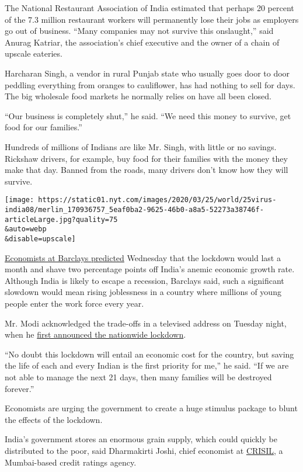 The National Restaurant Association of India estimated that perhaps 20
percent of the 7.3 million restaurant workers will permanently lose
their jobs as employers go out of business. ``Many companies may not
survive this onslaught,'' said Anurag Katriar, the association's chief
executive and the owner of a chain of upscale eateries.

Harcharan Singh, a vendor in rural Punjab state who usually goes door to
door peddling everything from oranges to cauliflower, has had nothing to
sell for days. The big wholesale food markets he normally relies on have
all been closed.

``Our business is completely shut,'' he said. ``We need this money to
survive, get food for our families.''

Hundreds of millions of Indians are like Mr. Singh, with little or no
savings. Rickshaw drivers, for example, buy food for their families with
the money they make that day. Banned from the roads, many drivers don't
know how they will survive.

\texttt{[image: https://static01.nyt.com/images/2020/03/25/world/25virus-india08/merlin\_170936757\_5eaf0ba2-9625-46b0-a8a5-52273a38746f-articleLarge.jpg?quality=75\\\&auto=webp\\\&disable=upscale]}

\href{https://www.bloombergquint.com/business/indias-21-day-lockdown-may-shave-off-2-percentage-points-off-gdp-growth}{Economists
at Barclays predicted} Wednesday that the lockdown would last a month
and shave two percentage points off India's anemic economic growth rate.
Although India is likely to escape a recession, Barclays said, such a
significant slowdown would mean rising joblessness in a country where
millions of young people enter the work force every year.

Mr. Modi acknowledged the trade-offs in a televised address on Tuesday
night, when he
\href{https://www.nytimes.com/2020/03/24/world/asia/india-coronavirus-lockdown.html}{first
announced the nationwide lockdown}.

``No doubt this lockdown will entail an economic cost for the country,
but saving the life of each and every Indian is the first priority for
me,'' he said. ``If we are not able to manage the next 21 days, then
many families will be destroyed forever.''

Economists are urging the government to create a huge stimulus package
to blunt the effects of the lockdown.

India's government stores an enormous grain supply, which could quickly
be distributed to the poor, said Dharmakirti Joshi, chief economist at
\href{https://www.crisil.com/en/home/about-us/our-offices.html\#}{CRISIL},
a Mumbai-based credit ratings agency.

